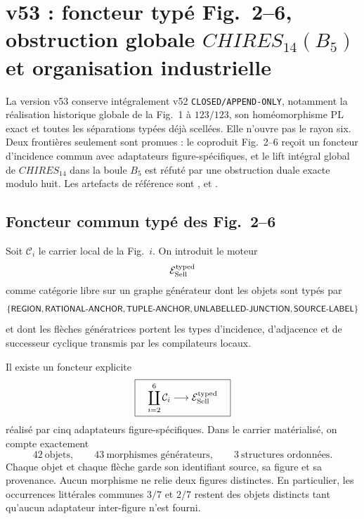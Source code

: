 \section{v53 : foncteur typé Fig.~2--6, obstruction globale $CHIRES_{14}(B_5)$ et organisation industrielle}

La version v53 conserve intégralement v52 \texttt{CLOSED/APPEND-ONLY}, notamment la réalisation historique globale de la Fig.~1 à $123/123$, son homéomorphisme PL exact et toutes les séparations typées déjà scellées. Elle n'ouvre pas le rayon six. Deux frontières seulement sont promues : le coproduit Fig.~2--6 reçoit un foncteur d'incidence commun avec adaptateurs figure-spécifiques, et le lift intégral global de $CHIRES_{14}$ dans la boule $B_5$ est réfuté par une obstruction duale exacte modulo huit. Les artefacts de référence sont ,  et .

\subsection{Foncteur commun typé des Fig.~2--6}

Soit $\mathcal C_i$ le carrier local de la Fig.~$i$. On introduit le moteur
\[
 \mathcal E_{\rm Sell}^{\rm typed}
\]
comme catégorie libre sur un graphe générateur dont les objets sont typés par
\[
 \{\textsf{REGION},\textsf{RATIONAL\mbox{-}ANCHOR},\textsf{TUPLE\mbox{-}ANCHOR},
   \textsf{UNLABELLED\mbox{-}JUNCTION},\textsf{SOURCE\mbox{-}LABEL}\}
\]
et dont les flèches génératrices portent les types d'incidence, d'adjacence et de successeur cyclique transmis par les compilateurs locaux.

\begin{proposition}\label{prop:v53-fig26-functor}
Il existe un foncteur explicite
\[
 \boxed{\quad
 \coprod_{i=2}^{6}\mathcal C_i
 \longrightarrow
 \mathcal E_{\rm Sell}^{\rm typed}
 \quad}
\]
réalisé par cinq adaptateurs figure-spécifiques. Dans le carrier matérialisé, on compte exactement
\[
 42\ \text{objets},\qquad 43\ \text{morphismes générateurs},\qquad
 3\ \text{structures ordonnées}.
\]
Chaque objet et chaque flèche garde son identifiant source, sa figure et sa provenance. Aucun morphisme ne relie deux figures distinctes. En particulier, les occurrences littérales communes $3/7$ et $2/7$ restent des objets distincts tant qu'aucun adaptateur inter-figure n'est fourni.
\end{proposition}


